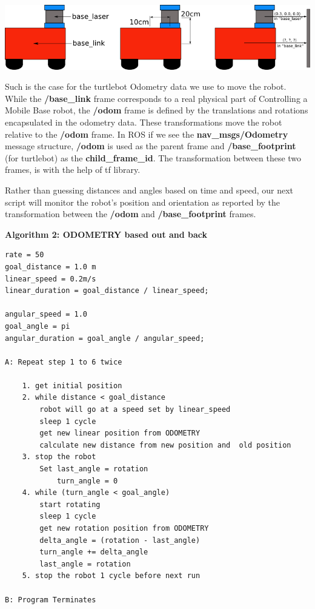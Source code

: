 \documentclass[10pt,a4paper]{article}
\begin{document}
\begin{center}
\includegraphics[width=\textwidth]{images/simple_robot.png}\\
\end{center}

Such is the case for the turtlebot Odometry data we use to move the robot.
While the \textbf{/base\_link} frame corresponds to a real physical part of Controlling a Mobile Base robot, the \textbf{/odom} frame is defined by the translations and rotations encapsulated in the odometry data. These transformations move the robot relative to the \textbf{/odom} frame.
In ROS if we see the \textbf{nav\_msgs/Odometry} message structure, \textbf{/odom }is used as the parent frame and \textbf{/base\_footprint} (for turtlebot) as the \textbf{child\_frame\_id}. The transformation between these two frames, is with the help of tf library.

Rather than guessing distances and angles based on time and speed, our next script will monitor the robot's position and orientation as reported by the transformation between the \textbf{/odom }and \textbf{/base\_footprint} frames.


\textbf{Algorithm 2: ODOMETRY based out and back}
\begin{lstlisting}[frame=single]
rate = 50
goal_distance = 1.0 m
linear_speed = 0.2m/s
linear_duration = goal_distance / linear_speed;

angular_speed = 1.0
goal_angle = pi
angular_duration = goal_angle / angular_speed;

A: Repeat step 1 to 6 twice

	1. get initial position
	2. while distance < goal_distance
		robot will go at a speed set by linear_speed
		sleep 1 cycle
		get new linear position from ODOMETRY
		calculate new distance from new position and  old position
	3. stop the robot
		Set last_angle = rotation
			turn_angle = 0
	4. while (turn_angle < goal_angle)
		start rotating
		sleep 1 cycle
		get new rotation position from ODOMETRY
		delta_angle = (rotation - last_angle)
		turn_angle += delta_angle
		last_angle = rotation	
	5. stop the robot 1 cycle before next run
	
B: Program Terminates
\end{lstlisting}
\end{document}
